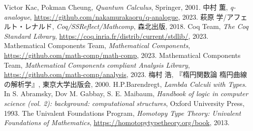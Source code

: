\documentclass[11pt]{jsreport}
\theoremstyle{mystyle}
\newcommand{\0}{\textbf{0}}
\begin{document}
\begin{thebibliography}{9}
   Victor Kac, Pokman Cheung, {\it{Quantum Calculus}}, Springer, 2001.
   中村 薫, {\it q-analogue}, \url{https://github.com/nakamurakaoru/q-analogue}, 2023.
   萩原 学/アフェルト・レナルド, {\it Coq/SSReflect/Mathcomp}, 森北出版, 
    2018.
   Coq Team, {\it The Coq Standard Library}, 
  \url{https://coq.inria.fr/distrib/current/stdlib/}, 2023.
   Mathematical Components Team, {\it Mathematical Components}, \url{https://github.com/math-comp/math-comp}, 2023.
   Mathematical Components Team, 
  {\it Mathematical Components compliant Analysis Library}, 
  \url{https://github.com/math-comp/analysis}, 2023.
   梅村 浩, 『楕円関数論  楕円曲線の解析学』, 東京大学出版会, 2000.
   H.P.Barendregt, {\it Lambda Calculi with Types}.  
    In S. Abramsky, Dov M. Gabbay, S. E. Maibaum, 
    {\it Handbook of logic in computer science (vol. 2): background:
     computational structures}, Oxford University Press, 1993.
   The Univalent Foundations Program, 
                      {\it{Homotopy Type Theory: Univalent Foundations of Mathematics}}, 
                      \url{https://homotopytypetheory.org/book}, 2013.

\end{thebibliography}
\end{document}
